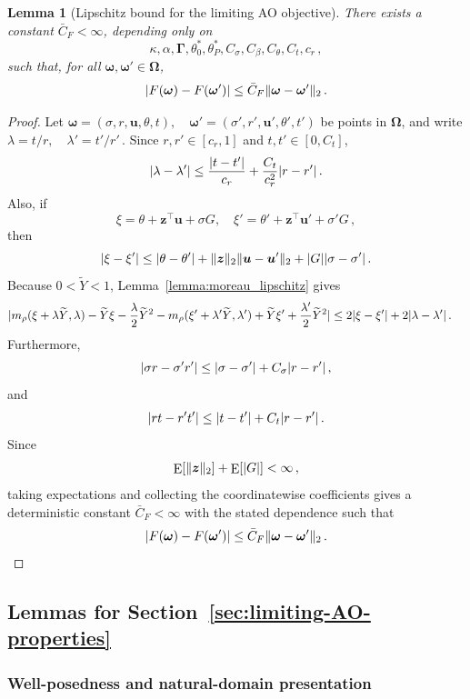 \documentclass{article}
\makeatletter
\DeclareMathOperator{\expect}{E}
\newtheorem{lemma}{Lemma}
\theoremstyle{definition}
\newcommand{\vnorm}[1]{%
	\ensuremath{%
		\if@display
		\left\| #1 \right\|
		\else
		\| #1 \|
		\fi
	}%
}
\newcommand{\abs}[1]{%
	\ensuremath{%
		\if@display
		\left| #1 \right|
		\else
		\lvert #1 \rvert
		\fi
	}%
}
\newcommand*{\bb}{\boldsymbol}
\def\bu{\bb{u}}
\def\Ytil{\widetilde{Y}}
\def\bz{\bb{z}}
\makeatother
\begin{document}
\begin{bibunit}
\begin{lemma}[Lipschitz bound for the limiting AO objective]
	\label{lemma:limit_ao_lipschitz}
	There exists a constant $\bar C_F<\infty$, depending only on
	$$
		\kappa,\alpha,\bb\Gamma,\theta_0^*,\theta_P^*,
		C_\sigma,C_\beta,C_\theta,C_t,c_r\,,
	$$
	such that, for all $\bb\omega,\bb\omega'\in\bb\Omega$,
	$$
		\abs{F(\bb\omega)-F(\bb\omega')}
		\leq
		\bar C_F
		\vnorm{\bb\omega-\bb\omega'}_2\,.
	$$
	\end{lemma}
	\begin{proof}
		Let $\bb\omega=(\sigma,r,\bu,\theta,t), \quad \bb\omega'=(\sigma',r',\bu',\theta',t')$
		be points in $\bb\Omega$, and write $\lambda=t/r, \quad \lambda'=t'/r'\,.$
	Since $r,r'\in[c_r,1]$ and $t,t'\in[0,C_t]$,
	$$
		\abs{\lambda-\lambda'}
		\leq
		\frac{\abs{t-t'}}{c_r}
		+
		\frac{C_t}{c_r^2}\abs{r-r'}\,.
	$$
	Also, if
	$$
		\xi=\theta+\bz^\top\bu+\sigma G,
		\quad
		\xi'=\theta'+\bz^\top\bu'+\sigma'G\,,
	$$
	then
	$$
		\abs{\xi-\xi'}
		\leq
		\abs{\theta-\theta'}
		+
		\vnorm{\bz}_2\vnorm{\bu-\bu'}_2
		+
		\abs{G}\abs{\sigma-\sigma'}\,.
	$$
	Because $0<\Ytil<1$, Lemma~\ref{lemma:moreau_lipschitz} gives
	$$
		\begin{aligned}
		&\abs{
			m_\rho(\xi+\lambda \Ytil,\lambda)
			-
			\Ytil\xi
			-
			\frac{\lambda}{2}\Ytil^2
			-
			m_\rho(\xi'+\lambda'\Ytil,\lambda')
			+
			\Ytil\xi'
			+
			\frac{\lambda'}{2}\Ytil^2
		}\leq
		2\abs{\xi-\xi'}
		+
		2\abs{\lambda-\lambda'}\,.
		\end{aligned}
	$$
	Furthermore,
	$$
		\abs{\sigma r-\sigma'r'}
		\leq
		\abs{\sigma-\sigma'}
		+
		C_\sigma\abs{r-r'}\,,
	$$
	and
	$$
		\abs{rt-r't'}
		\leq
		\abs{t-t'}
		+
		C_t\abs{r-r'}\,.
	$$
	Since
	$$
		\expect[\vnorm{\bz}_2]
		+
		\expect[\abs G]
		<
		\infty\,,
	$$
	taking expectations and collecting the coordinatewise coefficients
	gives a deterministic constant $\bar C_F<\infty$ with the stated
	dependence such that
	$$
		\abs{F(\bb\omega)-F(\bb\omega')}
		\leq
		\bar C_F
		\vnorm{\bb\omega-\bb\omega'}_2\,.
	$$
\end{proof}



\subsection{Lemmas for Section~\ref{sec:limiting-AO-properties}}

\subsubsection{Well-posedness and natural-domain presentation}



\end{bibunit}
\end{document}
